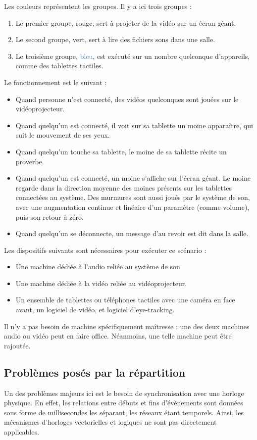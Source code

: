 Les couleurs représentent les groupes.
Il y a ici trois groupes : 

\begin{enumerate}
	\item Le premier groupe, \textcolor{BrickRed}{rouge}, sert à projeter de la vidéo sur un écran géant.
	\item Le second groupe, \textcolor{OliveGreen}{vert}, sert à lire des fichiers sons dans une salle.
	\item Le troisième groupe, \textcolor{SteelBlue}{bleu}, est exécuté sur un nombre quelconque d'appareils, comme des tablettes tactiles.  
\end{enumerate}

Le fonctionnement est le suivant : 
\begin{itemize}
	\item Quand personne n'est connecté, des vidéos quelconques sont jouées sur le vidéoprojecteur.
	\item Quand quelqu'un est connecté, il voit sur sa tablette un moine apparaître, qui suit le mouvement de ses yeux.
	\item Quand quelqu'un touche sa tablette, le moine de sa tablette récite un proverbe.
	\item Quand quelqu'un est connecté, un moine s'affiche sur l'écran géant. Le moine regarde dans la direction moyenne des moines présents sur les tablettes connectées au système. Des murmures sont aussi joués par le système de son, avec une augmentation continue et linéaire d'un paramètre (comme volume), puis son retour à zéro.
	\item Quand quelqu'un se déconnecte, un message d'au revoir est dit dans la salle.
\end{itemize}

Les dispositifs suivants sont nécessaires pour exécuter ce scénario : 
\begin{itemize}
	\item Une machine dédiée à l'audio reliée au système de son.
	\item Une machine dédiée à la vidéo reliée au vidéoprojecteur.
	\item Un ensemble de tablettes ou téléphones tactiles avec une caméra en face avant, un logiciel de vidéo, et logiciel d'eye-tracking.
\end{itemize}

Il n'y a pas besoin de machine spécifiquement maîtresse : une des deux machines audio ou vidéo peut en faire office.
Néanmoins, une telle machine peut être rajoutée.
\subsection{Problèmes posés par la répartition}
Un des problèmes majeurs ici est le besoin de synchronisation avec une horloge physique. En effet, les relations entre débuts et fins d'évènements sont données sous forme de millisecondes les séparant, les réseaux étant temporels. Ainsi, les mécanismes d'horloges vectorielles et logiques ne sont pas directement applicables.


